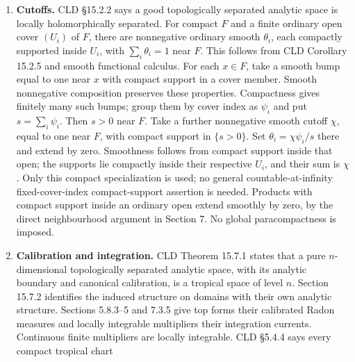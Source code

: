 \documentclass[
  11pt,
]{article}
\begin{document}
\begin{enumerate}
  CLD Proposition 3.4.4 states that for a G-tropical chart \(f:X\to V\)
  and a coefficient form \(\eta\), its pullback is zero in the G-form
  sheaf iff \(\eta\) restricts to zero on every compact domain image
  \(f(W)\). Proposition 3.4.1 gives the same criterion for the compact
  presheaf chart. We use this to prove a polynomial 1-form identity on a
  tropical tripod. The resulting forms are ordinary: the moments and
  coefficient formulas are defined on an ordinary neighbourhood, and
  equality in the containing G-sheaf is equality in its ordinary
  subsheaf. No ordinary descent of an arbitrary G-local form is
  asserted.
\item
  \textbf{Cutoffs.} CLD §15.2.2 says a good topologically separated
  analytic space is locally holomorphically separated. For compact \(F\) and a finite ordinary open cover \((U_i)\) of
  \(F\), there are nonnegative ordinary smooth \(\theta_i\), each
  compactly supported inside \(U_i\), with \(\sum_i\theta_i=1\)
  near \(F\). This follows from CLD Corollary 15.2.5 and smooth
  functional calculus. For each \(x\in F\), take a smooth bump
  equal to one near \(x\) with compact support in a cover member.
  Smooth nonnegative composition preserves these properties.
  Compactness gives finitely many such bumps; group them by cover
  index as \(\psi_i\) and put \(s=\sum_i\psi_i\). Then \(s>0\)
  near \(F\). Take a further nonnegative smooth cutoff \(\chi\),
  equal to one near \(F\), with compact support in \(\{s>0\}\).
  Set \(\theta_i=\chi\psi_i/s\) there and extend by zero.
  Smoothness follows from compact support inside that open; the
  supports lie compactly inside their respective \(U_i\), and
  their sum is \(\chi\). Only this compact specialization is used;
  no general countable-at-infinity fixed-cover-index compact-support
  assertion is needed. Products with compact
  support inside an ordinary open extend smoothly by zero, by the direct
  neighbourhood argument in Section 7. No global paracompactness is
  imposed.
\item
  \textbf{Calibration and integration.} CLD Theorem 15.7.1 states that a
  pure \(n\)-dimensional topologically separated analytic space, with
  its analytic boundary and canonical calibration, is a tropical space
  of level \(n\). Section 15.7.2 identifies the induced structure on
  domains with their own analytic structure. Sections 5.8.3--5 and 7.3.5
  give top forms their calibrated Radon measures and locally integrable
  multipliers their integration currents. Continuous finite multipliers
  are locally integrable. CLD §5.4.4 says every compact tropical chart

\end{enumerate}
\end{document}
